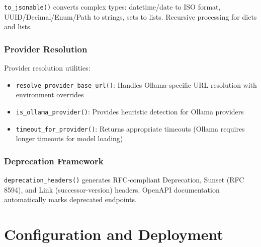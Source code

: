 \documentclass[a4paper,twoside]{sapthesis}
\begin{document}
\texttt{to\_jsonable()} converts complex types: datetime/date to ISO format, UUID/Decimal/Enum/Path to strings, sets to lists. Recursive processing for dicts and lists.

\subsection{Provider Resolution}
\label{subsec:provider-resolution}

Provider resolution utilities:
\begin{itemize}
    \item \texttt{resolve\_provider\_base\_url()}: Handles Ollama-specific URL resolution with environment overrides
    \item \texttt{is\_ollama\_provider()}: Provides heuristic detection for Ollama providers
    \item \texttt{timeout\_for\_provider()}: Returns appropriate timeouts (Ollama requires longer timeouts for model loading)
\end{itemize}

\subsection{Deprecation Framework}
\label{subsec:deprecation}

\texttt{deprecation\_headers()} generates RFC-compliant Deprecation, Sunset (RFC 8594), and Link (successor-version) headers. OpenAPI documentation automatically marks deprecated endpoints.



\chapter{Configuration and Deployment}
\label{ch:deployment}
\end{document}
